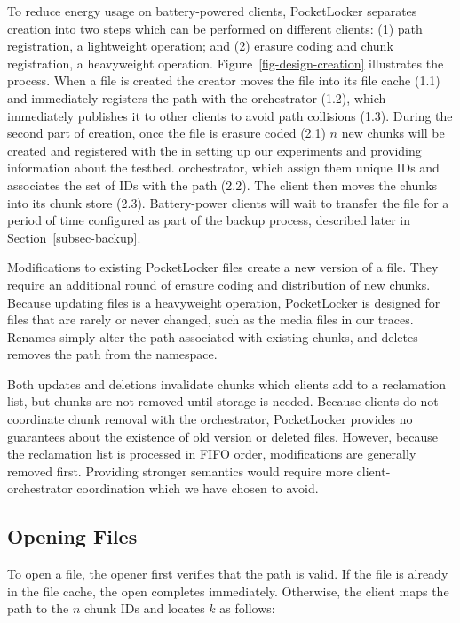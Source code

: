 To reduce energy usage on battery-powered clients, PocketLocker separates
creation into two steps which can be performed on different clients: (1) path
registration, a lightweight operation; and (2) erasure coding and chunk
registration, a heavyweight operation. Figure~\ref{fig-design-creation}
illustrates the process. When a file is created the creator moves the file
into its file cache (1.1) and immediately registers the path with the
orchestrator (1.2), which immediately publishes it to other clients to avoid
path collisions (1.3). During the second part of creation, once the file is
erasure coded (2.1) $n$ new chunks will be created and registered with the
in setting up our experiments and providing information about the testbed.
orchestrator, which assign them unique IDs and associates the set of IDs with
the path (2.2). The client then moves the chunks into its chunk store (2.3).
Battery-power clients will wait to transfer the file for a period of time
configured as part of the backup process, described later in
Section~\ref{subsec-backup}.

Modifications to existing PocketLocker files create a new version of a file.
They require an additional round of erasure coding and distribution of new
chunks. Because updating files is a heavyweight operation, PocketLocker is
designed for files that are rarely or never changed, such as the media files
in our traces. Renames simply alter the path associated with existing chunks,
and deletes removes the path from the namespace.

Both updates and deletions invalidate chunks which clients add to a
reclamation list, but chunks are not removed until storage is needed. Because
clients do not coordinate chunk removal with the orchestrator, PocketLocker
provides no guarantees about the existence of old version or deleted files.
However, because the reclamation list is processed in FIFO order,
modifications are generally removed first. Providing stronger semantics would
require more client-orchestrator coordination which we have chosen to avoid.

\subsection{Opening Files}

To open a file, the opener first verifies that the path is valid. If the file
is already in the file cache, the open completes immediately. Otherwise, the
client maps the path to the $n$ chunk IDs and locates $k$ as follows:

